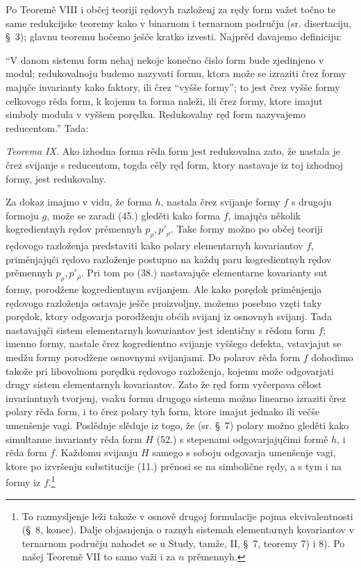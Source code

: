 \documentclass[11pt]{article}
\begin{document}
Po Teoremě VIII i občej teoriji rędovyh razloženj za rędy form važet točno te same redukcijske teoremy kako v binarnom i ternarnom području (sr. disertaciju, \S\ 3); glavnu teoremu hočemo ješče kratko izvesti. Najprěd davajemo definiciju:

``V danom sistemu form nehaj nekoje konečno čislo form bude zjedinjeno v modul; redukovalnoju budemo nazyvati formu, ktora može se izraziti črez formy majųče invarianty kako faktory, ili črez ``vyšše formy''; to jest črez vyšše formy celkovogo rěda form, k kojemu ta forma naleži, ili črez formy, ktore imajut simboly modula v vyššem porędku. Redukovalny ręd form nazyvajemo reducentom.'' Tada:

\emph{Teorema IX.} Ako izhodna forma rěda form jest redukovalna zato, že nastala je črez svijanje s reducentom, togda cěly ręd form, ktory nastavaje iz toj izhodnoj formy, jest redukovalny.

Za dokaz imajmo v vidu, že forma $h$, nastala črez svijanje formy $f$ s drugoju formoju $g$, može se zaradi (45.) gleděti kako forma $f$, imajųča několik kogredientnyh rędov prěmennyh $p_\rho,p'_\rho$. Take formy možno po občej teoriji rędovogo razloženja predstaviti kako polary elementarnyh kovariantov $f$, priměnjajųči rędovo razloženje postupno na každų paru kogredientnyh rędov prěmennyh $p_\rho,p'_\rho$. Pri tom po (38.) nastavajųče elementarne kovarianty sut formy, porodžene kogredientnym svijanjem. Ale kako porędok priměnjenja rędovogo razloženja ostavaje ješče proizvoljny, možemo posebno vzęti taky porędok, ktory odgovarja porodženju obćih svijanj iz osnovnyh svijanj. Tada nastavajųči sistem elementarnyh kovariantov jest identičny s rědom form $f$; imenno formy, nastale črez kogredientno svijanje vyššego defekta, vstavjajut se medžu formy porodžene osnovnymi svijanjami. Do polarov rěda form $f$ dohodimo takože pri libovolnom porędku rędovogo razloženja, kojemu može odgovarjati drugy sistem elementarnyh kovariantov. Zato že ręd form vyčerpava cělost invariantnyh tvorjenj, vsaku formu drugogo sistema možno linearno izraziti črez polary rěda form, i to črez polary tyh form, ktore imajut jednako ili večše umenšenje vagi. Poslědnje slěduje iz togo, že (sr. \S\ 7) polary možno gleděti kako simultanne invarianty rěda form $H$ (52.) s stepenami odgovarjajųčimi formě $h$, i rěda form $f$. Každomu svijanju $H$ samego s soboju odgovarja umenšenje vagi, ktore po izvršenju substitucije (11.) prěnosi se na simbolične rędy, a s tym i na formy iz $f$.\footnote{To razmysljenje leži takože v osnově drugoj formulacije pojma ekvivalentnosti (\S\ 8, konec). Dalje objasnjenja o raznyh sistemah elementarnyh kovariantov v ternarnom području nahodet se u Study, tamže, II, \S\ 7, teoremy 7) i 8). Po našej Teoremě VII to samo važi i za $n$ prěmennyh.}
\end{document}
